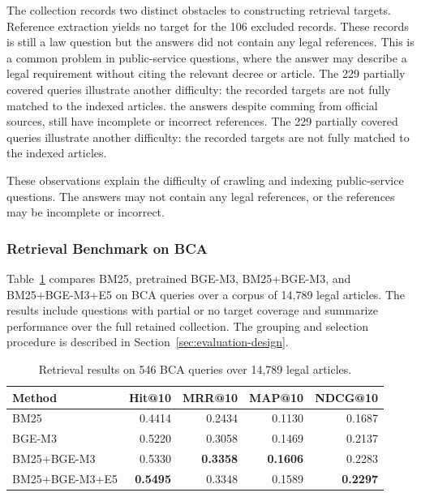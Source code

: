 The collection records two distinct obstacles to constructing retrieval targets. Reference extraction yields no target for the 106 excluded records. These records is still a law question but the answers did not contain any legal references. This is a common problem in public-service questions, where the answer may describe a legal requirement without citing the relevant decree or article. The 229 partially covered queries illustrate another difficulty: the recorded targets are not fully matched to the indexed articles. the answers despite comming from official sources, still have incomplete or incorrect references. The 229 partially covered queries illustrate another difficulty: the recorded targets are not fully matched to the indexed articles.


These observations explain the difficulty of crawling and indexing public-service questions. The answers may not contain any legal references, or the references may be incomplete or incorrect.

\subsubsection{Retrieval Benchmark on BCA}

Table~\ref{tab:5.5} compares BM25, pretrained BGE-M3, BM25+BGE-M3, and BM25+BGE-M3+E5 on BCA queries over a corpus of 14,789 legal articles. The results include questions with partial or no target coverage and summarize performance over the full retained collection. The grouping and selection procedure is described in Section~\ref{sec:evaluation-design}.

\begin{table}[H]
\centering
\small
\caption{Retrieval results on 546 BCA queries over 14,789 legal articles.}\label{tab:5.5}
\begin{tabular}{@{}p{6cm}rrrr@{}}
\toprule
\textbf{Method} & \textbf{Hit@10} & \textbf{MRR@10} & \textbf{MAP@10} & \textbf{NDCG@10}\\
\midrule
BM25 & 0.4414 & 0.2434 & 0.1130 & 0.1687 \\
BGE-M3 & 0.5220 & 0.3058 & 0.1469 & 0.2137 \\
BM25+\allowbreak{}BGE-M3 & 0.5330 & \textbf{0.3358} & \textbf{0.1606} & 0.2283 \\
BM25+\allowbreak{}BGE-M3+\allowbreak{}E5 & \textbf{0.5495} & 0.3348 & 0.1589 & \textbf{0.2297} \\
\bottomrule
\end{tabular}
\end{table}

